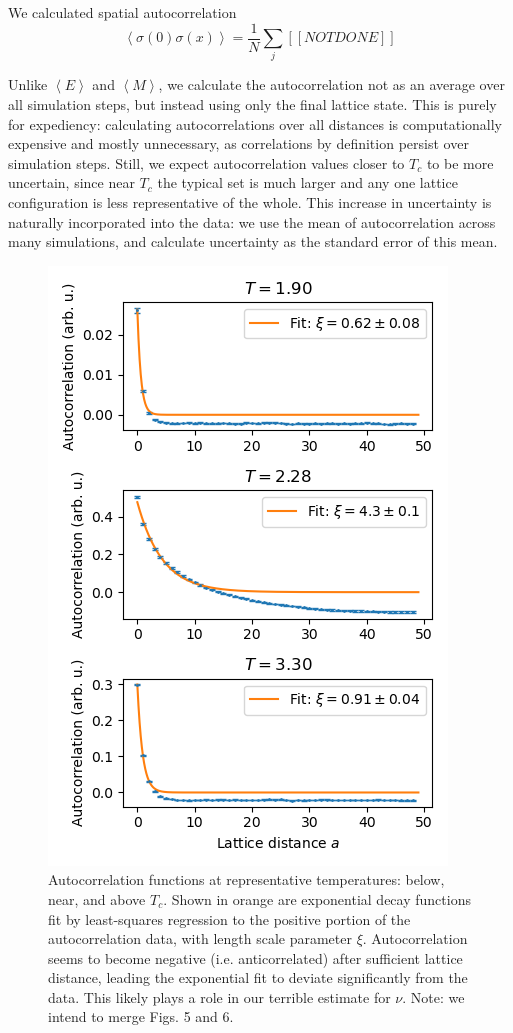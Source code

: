 \documentclass[letter,scriptaddress,twocolumn, prl,nofootinbib]{revtex4}
\newcommand{\submin}[1]{\left\langle #1 \right\rangle}
\begin{document}
We calculated spatial autocorrelation 
\begin{equation}
	\label{autocor}
	\submin{\sigma(0)\sigma(x)} = \frac{1}{N}\sum_{j} [[NOT DONE]]
\end{equation}

Unlike $\submin{E}$ and $\submin{M}$, we calculate the autocorrelation not as an average over all simulation steps, but instead using only the final lattice state. This is purely for expediency: calculating autocorrelations over all distances is computationally expensive and mostly unnecessary, as correlations by definition persist over simulation steps. Still, we expect autocorrelation values closer to $T_c$ to be more uncertain, since near $T_c$ the typical set is much larger and any one lattice configuration is less representative of the whole. This increase in uncertainty is naturally incorporated into the data: we use the mean of autocorrelation across many simulations, and calculate uncertainty as the standard error of this mean.

\begin{figure}[h]
	\begin{center}
		\includegraphics[width=.4\textwidth]{figs/fig4_autocors.png}
		\caption{Autocorrelation functions at representative temperatures: below, near, and above $T_c$. Shown in orange are exponential decay functions fit by least-squares regression to the positive portion of the autocorrelation data, with length scale parameter $\xi$. Autocorrelation seems to become negative (i.e. anticorrelated) after sufficient lattice distance, leading the exponential fit to deviate significantly from the data. This likely plays a role in our terrible estimate for $\nu$. Note: we intend to merge Figs. 5 and 6.}
		\label{fig:fig4a}
	\end{center}
\end{figure}
\end{document}
